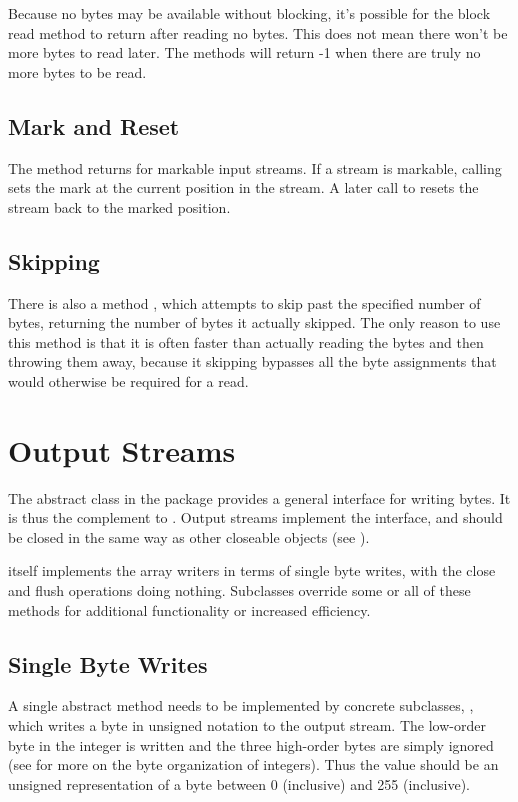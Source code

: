 Because no bytes may be available without blocking, it's possible for
the block read method to return after reading no bytes.  This does not
mean there won't be more bytes to read later.  The 
methods will return -1 when there are truly no more bytes to be read.

\subsection{Mark and Reset}

The method  returns  for markable
input streams.  If a stream is markable, calling  sets
the mark at the current position in the stream.  A later call to
 resets the stream back to the marked position.

\subsection{Skipping}

There is also a method , which attempts to skip past
the specified number of bytes, returning the number of bytes it
actually skipped.  The only reason to use this method is that it is
often faster than actually reading the bytes and then throwing them
away, because it skipping bypasses all the byte assignments that
would otherwise be required for a read.


\section{Output Streams}

The  abstract class in the package 
provides a general interface for writing bytes.  It is thus the
complement to .  Output streams implement the
 interface, and should be closed in the same way
as other closeable objects (see ).

 itself implements the array writers in terms of
single byte writes, with the close and flush operations doing nothing.
Subclasses override some or all of these methods for additional
functionality or increased efficiency.


\subsection{Single Byte Writes}

A single abstract method needs to be implemented by concrete
subclasses, , which writes a byte in unsigned
notation to the output stream.  The low-order byte in the integer is
written and the three high-order bytes are simply ignored (see
 for more on the byte organization of integers).
Thus the value should be an unsigned representation of a byte between
0 (inclusive) and 255 (inclusive).

